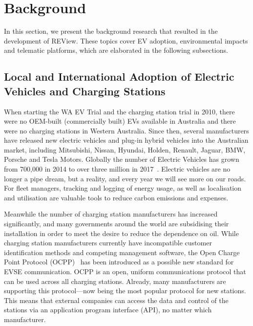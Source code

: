 \section{Background}
\label{sec:9:bg}
In this section, we present the background research that resulted in the development of REView. These topics cover EV adoption, environmental impacts and telematic platforms, which are elaborated in the following subsections.

\subsection{Local and International Adoption of Electric Vehicles and Charging Stations}
When starting the WA EV Trial and the charging station trial in 2010, there were no OEM-built (commercially built) EVs available in Australia and there were no charging stations in Western Australia. Since then, several manufacturers have released new electric vehicles and plug-in hybrid vehicles into the Australian market, including Mitsubishi, Nissan, Hyundai, Holden, Renault, Jaguar, BMW, Porsche and Tesla Motors. Globally the number of Electric Vehicles has grown from 700,000 in 2014 to over three million in 2017~\cite{international_energy_agency_global_2018}. Electric vehicles are no longer a pipe dream, but a reality, and every year we will see more on our roads. For fleet managers, tracking and logging of energy usage, as well as localisation and utilisation are valuable tools to reduce carbon emissions and expenses.

Meanwhile the number of charging station manufacturers has increased significantly, and many governments around the world are subsidising their installation in order to meet the desire to reduce the dependence on oil. While charging station manufacturers currently have incompatible customer identification methods and competing management software, the Open Charge Point Protocol (OCPP)~\cite{a._rodriguez-serrano_communication_2013} has been introduced as a possible new standard for EVSE communication. OCPP is an open, uniform communications protocol that can be used across all charging stations. Already, many manufacturers are supporting this protocol---now being the most popular protocol for new stations. This means that external companies can access the data and control of the stations via an application program interface (API), no matter which manufacturer.


